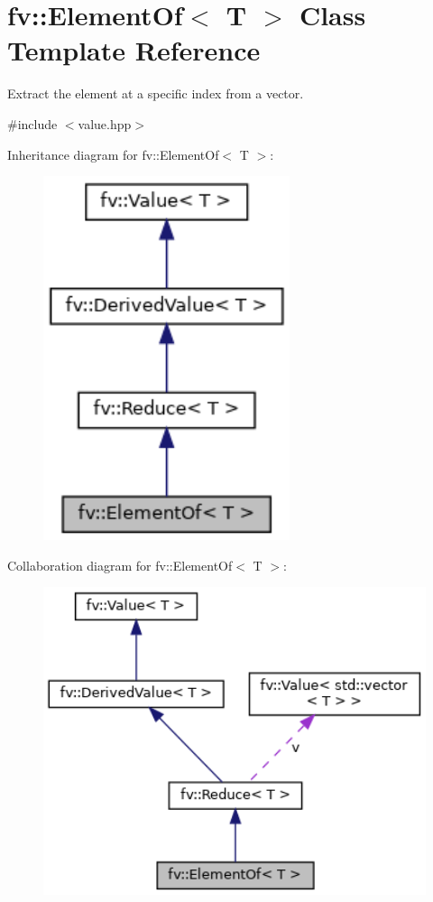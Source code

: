 \hypertarget{classfv_1_1ElementOf}{}\section{fv\+:\+:Element\+Of$<$ T $>$ Class Template Reference}
\label{classfv_1_1ElementOf}


Extract the element at a specific index from a vector.  




{\ttfamily \#include $<$value.\+hpp$>$}



Inheritance diagram for fv\+:\+:Element\+Of$<$ T $>$\+:
\nopagebreak
\begin{figure}[H]
\begin{center}
\leavevmode
\includegraphics[width=205pt]{classfv_1_1ElementOf__inherit__graph}
\end{center}
\end{figure}


Collaboration diagram for fv\+:\+:Element\+Of$<$ T $>$\+:
\nopagebreak
\begin{figure}[H]
\begin{center}
\leavevmode
\includegraphics[width=350pt]{classfv_1_1ElementOf__coll__graph}
\end{center}
\end{figure}

